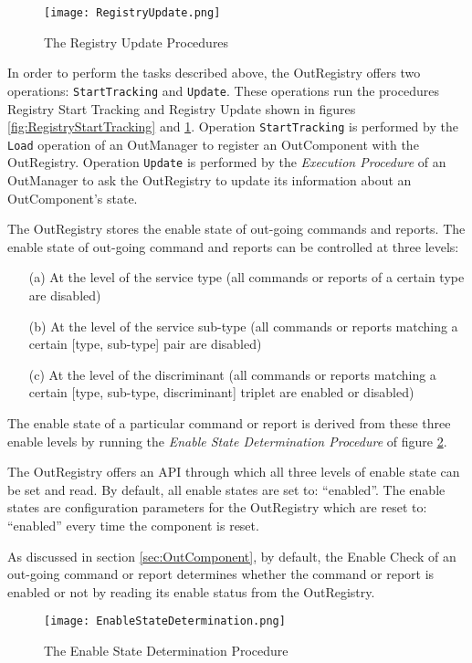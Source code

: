 \begin{figure}[h]
 \centering
 \texttt{[image: RegistryUpdate.png]}
 \caption{The Registry Update Procedures}
 \label{fig:RegistryUpdate}
\end{figure}


In order to perform the tasks described above, the OutRegistry offers two operations: \texttt{StartTracking} and \texttt{Update}. These operations run the procedures Registry Start Tracking and Registry Update shown in figures \ref{fig:RegistryStartTracking} and \ref{fig:RegistryUpdate}. Operation \texttt{StartTracking} is performed by the \texttt{Load} operation of an OutManager to register an OutComponent with the OutRegistry. Operation \texttt{Update} is performed by the \textit{Execution Procedure} of an OutManager to ask the OutRegistry to update its information about an OutComponent's state.

The OutRegistry stores the enable state of out-going commands and reports. The enable state of out-going command and reports can be controlled at three levels: 
\begin{itemize}
\item[(a)] At the level of the service type (all commands or reports of a certain type are disabled)
\item[(b)] At the level of the service sub-type (all commands or reports matching a certain [type, sub-type] pair are disabled)
\item[(c)] At the level of the discriminant (all commands or reports matching a certain [type, sub-type, discriminant] triplet are enabled or disabled)
\end{itemize}
The enable state of a particular command or report is derived from these three enable levels by running the \textit{Enable State Determination Procedure} of figure \ref{fig:EnableStateDetermination}.

The OutRegistry offers an API through which all three levels of enable state can be set and read. By default, all enable states are set to: “enabled”. The enable states are configuration parameters for the OutRegistry which are reset to: “enabled” every time the component is reset.

As discussed in section \ref{sec:OutComponent}, by default, the Enable Check of an out-going command or report determines whether the command or report is enabled or not by reading its enable status from the OutRegistry. 

\begin{figure}[H]
 \centering
 \texttt{[image: EnableStateDetermination.png]}
 \caption{The Enable State Determination Procedure}
 \label{fig:EnableStateDetermination}
\end{figure}

